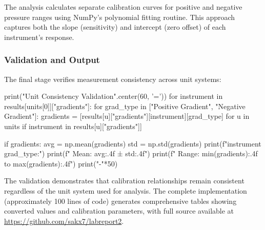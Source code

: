 \documentclass{article}
\begin{document}
The analysis calculates separate calibration curves for positive and negative pressure ranges using NumPy's polynomial fitting routine. This approach captures both the slope (sensitivity) and intercept (zero offset) of each instrument's response.

\subsubsection{Validation and Output}
The final stage verifies measurement consistency across unit systems:

\begin{python}
print("Unit Consistency Validation".center(60, '='))
for instrument in results[units[0]]["gradients"]:
    for grad_type in ["Positive Gradient", "Negative Gradient"]:
        gradients = [results[u]["gradients"][instrument][grad_type] 
                    for u in units if instrument in results[u]["gradients"]]
        
        if gradients:
            avg = np.mean(gradients)
            std = np.std(gradients)
            print(f"{instrument} {grad_type}:")
            print(f"  Mean: {avg:.4f} ± {std:.4f}")
            print(f"  Range: {min(gradients):.4f} to {max(gradients):.4f}")
            print("-"*50)
\end{python}

The validation demonstrates that calibration relationships remain consistent regardless of the unit system used for analysis. The complete implementation (approximately 100 lines of code) generates comprehensive tables showing converted values and calibration parameters, with full source available at \url{https://github.com/sakx7/labreport2}.
\end{document}
